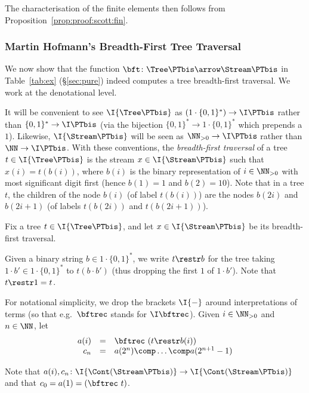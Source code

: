 The characterisation of the finite elements then follows from
Proposition~\ref{prop:proof:scott:fin}.

\subsubsection{Martin Hofmann's Breadth-First Tree Traversal}
\label{sec:proof:sem:stream-tree:bft}

We now show that the function
$\bft \colon \Tree\PTbis \arrow \Stream\PTbis$
in Table~\ref{tab:ex} (\S\ref{sec:pure})
indeed computes a tree breadth-first traversal.
We work at the denotational level.

It will be convenient to see $\I{\Tree\PTbis}$
as $(1 \cdot \{0,1\}^*) \to \I\PTbis$
rather than $\{0,1\}^* \to \I\PTbis$
(via the bijection $\{0,1\}^* \to 1 \cdot \{0,1\}^*$ which prepends a $1$).
Likewise, $\I{\Stream\PTbis}$
will be seen as $\NN_{>0} \to \I\PTbis$ rather than
$\NN \to \I\PTbis$.
With these conventions, the \emph{breadth-first traversal}
of a tree $t \in \I{\Tree\PTbis}$
is the stream $x \in \I{\Stream\PTbis}$
such that $x(i) = t(b(i))$,
where $b(i)$ is the binary representation of $i \in \NN_{>0}$
with most significant digit first
(hence $b(1) = 1$ and $b(2) = 10$).
Note that %
in a tree $t$,
the children of the node $b(i)$ (of label $t(b(i))$)
are the nodes $b(2i)$ and $b(2i+1)$
(of labels $t(b(2i))$ and $t(b(2i+1))$).


Fix a tree $t \in \I{\Tree\PTbis}$,
and let $x \in \I{\Stream\PTbis}$ be its breadth-first traversal.

Given a binary string $b \in 1 \cdot\{0,1\}^*$,
we write $t \restr b$ for the tree taking $1 \cdot b' \in 1 \cdot \{0,1\}^*$
to $t(b \cdot b')$ (thus dropping the first $1$ of $1 \cdot b'$).
Note that $t\restr 1 = t$.

For notational simplicity, we drop the brackets $\I{-}$
around interpretations of terms
(so that e.g.\ $\bftrec$ stands for $\I\bftrec$).
Given $i \in \NN_{>0}$ and $n \in \NN$,
let
\[
\begin{array}{r c l}
  a(i)
& =
& \bftrec\ (t \restr b(i))
\\
%
  c_n
& =
& a(2^n) \comp \dots \comp a(2^{n+1}-1)
\end{array}
\]

\noindent
Note that
\(
  a(i), c_n \colon
  \I{\Cont(\Stream \PTbis)}
  \to
  \I{\Cont(\Stream \PTbis)}
\)
and that $c_0 = a(1) = (\bftrec\ t)$.

